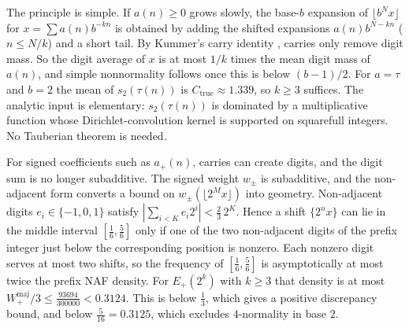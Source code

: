 \documentclass[11pt]{article}
\newcommand{\Ctrue}{C_{\mathrm{true}}}
\newcommand{\wpm}{w_{\pm}}
\begin{document}
The principle is simple. If $a(n)\ge0$ grows slowly, the base-$b$ expansion of $\lfloor b^Nx\rfloor$ for $x=\sum a(n)b^{-kn}$ is obtained by adding the shifted expansions $a(n)b^{N-kn}$ ($n\le N/k$) and a short tail. By Kummer's carry identity \cite{Kummer1852}, carries only remove digit mass. So the digit average of $x$ is at most $1/k$ times the mean digit mass of $a(n)$, and simple nonnormality follows once this is below $(b-1)/2$. For $a=\tau$ and $b=2$ the mean of $s_2(\tau(n))$ is $\Ctrue\approx1.339$, so $k\ge3$ suffices. The analytic input is elementary: $s_2(\tau(n))$ is dominated by a multiplicative function whose Dirichlet-convolution kernel is supported on squarefull integers. No Tauberian theorem is needed.

For signed coefficients such as $a_+(n)$, carries can create digits, and the digit sum is no longer subadditive. The signed weight $\wpm$ is subadditive, and the non-adjacent form converts a bound on $\wpm(\lfloor2^Mx\rfloor)$ into geometry. Non-adjacent digits $e_i\in\{-1,0,1\}$ satisfy $|\sum_{i<K}e_i2^i|<\frac23\,2^K$. Hence a shift $\{2^nx\}$ can lie in the middle interval $[\frac16,\frac56]$ only if one of the two non-adjacent digits of the prefix integer just below the corresponding position is nonzero. Each nonzero digit serves at most two shifts, so the frequency of $[\frac16,\frac56]$ is asymptotically at most twice the prefix NAF density. For $E_+(2^k)$ with $k\ge3$ that density is at most $W_+^{\mathrm{maj}}/3\le\frac{93694}{300000}<0.3124$. This is below $\frac13$, which gives a positive discrepancy bound, and below $\frac5{16}=0.3125$, which excludes $4$-normality in base $2$.
\end{document}
